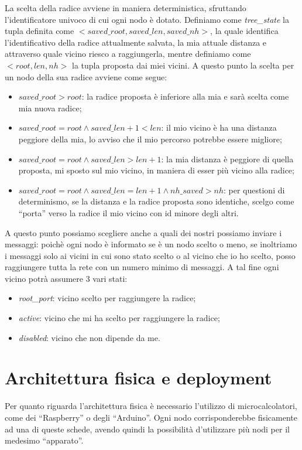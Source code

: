 \documentclass[italian]{memoir}
\begin{document}
La scelta della radice avviene in maniera deterministica, sfruttando l'identificatore univoco di cui ogni nodo è dotato. Definiamo come \textit{tree\_state} la tupla definita come $<saved\_root, saved\_len, saved\_nh>$, la quale identifica l'identificativo della radice attualmente salvata, la mia attuale distanza e attraverso quale vicino riesco a raggiungerla, mentre definiamo come $<root, len, nh>$ la tupla proposta dai miei vicini. A questo punto la scelta per un nodo della sua radice avviene come segue:
\begin{itemize}
    \item $saved\_root > root$: la radice proposta è inferiore alla mia e sarà scelta come mia nuova radice;
    \item $saved\_root = root \land saved\_len + 1 < len$: il mio vicino è ha una distanza peggiore della mia, lo avviso che il mio percorso potrebbe essere migliore;
    \item $saved\_root = root \land saved\_len > len + 1 $: la mia distanza è peggiore di quella proposta, mi sposto sul mio vicino, in maniera di esser più vicino alla radice;
    \item $saved\_root = root \land saved\_len = len + 1  \land nh\_saved > nh$: per questioni di determinismo, se la distanza e la radice proposta sono identiche, scelgo come ``porta'' verso la radice il mio vicino con id minore degli altri.
\end{itemize}

A questo punto possiamo scegliere anche a quali dei nostri possiamo inviare i messaggi: poichè ogni nodo è informato se è un nodo scelto o meno, se inoltriamo i messaggi solo ai vicini in cui sono stato scelto o al vicino che io ho scelto, posso raggiungere tutta la rete con un numero minimo di messaggi. A tal fine ogni vicino potrà assumere 3 vari stati:
\begin{itemize}
    \item\textit{root\_port}: vicino scelto per raggiungere la radice;
    \item\textit{active}: vicino che mi ha scelto per raggiungere la radice;
    \item\textit{disabled}: vicino che non dipende da me.
\end{itemize}


\section{Architettura fisica e deployment}
Per quanto riguarda l'architettura fisica è necessario l'utilizzo di microcalcolatori,
	   come dei ``Raspberry'' o degli ``Arduino''. Ogni nodo corrisponderebbe fisicamente
	   ad una di queste schede, avendo quindi la possibilità d'utilizzare più nodi
	   per
	   il medesimo ``apparato''.
\end{document}
